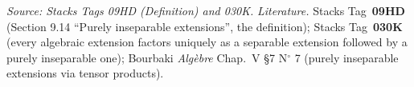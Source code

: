 \begin{remark}
  \textit{Source: Stacks Tags 09HD (Definition) and 030K.}
  \emph{Literature.} Stacks Tag~\textbf{09HD} (Section 9.14 ``Purely inseparable extensions'', the definition); Stacks Tag~\textbf{030K} (every algebraic extension factors uniquely as a separable extension followed by a purely inseparable one); Bourbaki \emph{Alg\`ebre} Chap.~V \S 7 N\(^\circ\) 7 (purely inseparable extensions via tensor products).
\end{remark}

